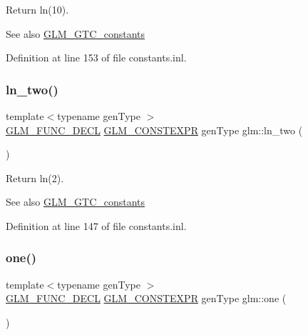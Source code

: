 Return ln(10). \begin{DoxySeeAlso}{See also}
\mbox{\hyperlink{group__gtc__constants}{G\+L\+M\+\_\+\+G\+T\+C\+\_\+constants}} 
\end{DoxySeeAlso}


Definition at line 153 of file constants.\+inl.

\mbox{\label{group__gtc__constants_ga24f4d27765678116f41a2f336ab7975c}} 
\subsubsection{\texorpdfstring{ln\_two()}{ln\_two()}}
{\footnotesize\ttfamily template$<$typename gen\+Type $>$ \\
\mbox{\hyperlink{setup_8hpp_ab2d052de21a70539923e9bcbf6e83a51}{G\+L\+M\+\_\+\+F\+U\+N\+C\+\_\+\+D\+E\+CL}} \mbox{\hyperlink{setup_8hpp_a08b807947b47031d3a511f03f89645ad}{G\+L\+M\+\_\+\+C\+O\+N\+S\+T\+E\+X\+PR}} gen\+Type glm\+::ln\+\_\+two (\begin{DoxyParamCaption}{ }\end{DoxyParamCaption})}

Return ln(2). \begin{DoxySeeAlso}{See also}
\mbox{\hyperlink{group__gtc__constants}{G\+L\+M\+\_\+\+G\+T\+C\+\_\+constants}} 
\end{DoxySeeAlso}


Definition at line 147 of file constants.\+inl.

\mbox{\label{group__gtc__constants_ga39c2fb227631ca25894326529bdd1ee5}} 
\subsubsection{\texorpdfstring{one()}{one()}}
{\footnotesize\ttfamily template$<$typename gen\+Type $>$ \\
\mbox{\hyperlink{setup_8hpp_ab2d052de21a70539923e9bcbf6e83a51}{G\+L\+M\+\_\+\+F\+U\+N\+C\+\_\+\+D\+E\+CL}} \mbox{\hyperlink{setup_8hpp_a08b807947b47031d3a511f03f89645ad}{G\+L\+M\+\_\+\+C\+O\+N\+S\+T\+E\+X\+PR}} gen\+Type glm\+::one (\begin{DoxyParamCaption}{ }\end{DoxyParamCaption})}

